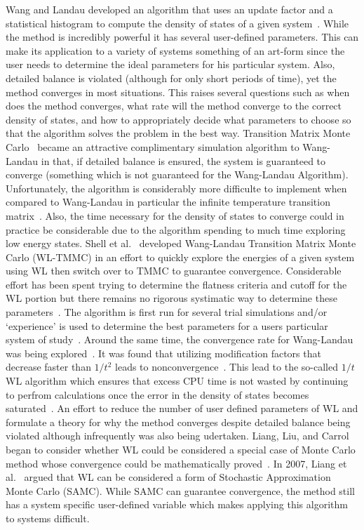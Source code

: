 \documentclass[letterpaper,twocolumn,amsmath,amssymb,pre,aps,10pt]{revtex4-1}
\begin{document}
Wang and Landau developed an algorithm that uses an update
factor and a statistical histogram to compute the density of states of
a given system~\cite{wang2001determining, wang2001efficient}.  While
the method is incredibly powerful it has several user-defined
parameters.  This can make its application to a variety of systems
something of an art-form since the user needs to determine the ideal
parameters for his particular system.  Also, detailed balance is
violated (although for only short periods of time), yet the method
converges in most situations.  This raises several questions such as
when does the method converges, what rate will the method converge to
the correct density of states, and how to appropriately decide what
parameters to choose so that the algorithm solves the problem in the
best way. Transition Matrix Monte Carlo~\cite{wang1999transition,
swendsen1999transition, fitzgerald2000monte} became an attractive
complimentary simulation algorithm to Wang-Landau in that, if detailed
balance is ensured, the system is guaranteed to converge (something
which is not guaranteed for the Wang-Landau Algorithm).  Unfortunately,
the algorithm is considerably more difficulte to implement when
compared to Wang-Landau in particular the infinite temperature
transition matrix~\cite{wang2002transition}.  Also, the time necessary
for the density of states to converge could in practice be considerable
due to the algorithm spending to much time exploring low energy states.
Shell et al.~\cite{shell2003improved, shell2004flat} developed
Wang-Landau Transition Matrix Monte Carlo (WL-TMMC) in an effort to
quickly explore the energies of a given system using WL then switch
over to TMMC to guarantee convergence. Considerable effort has been
spent trying to determine the flatness criteria and cutoff for the WL
portion but there remains no rigorous systimatic way to determine these
parameters~\cite{rane2013monte}.  The algorithm is first run for
several trial simulations and/or `experience' is used to determine the
best parameters for a users particular system of
study~\cite{siderius2013use}.  Around the same time, the convergence
rate for Wang-Landau was being explored~\cite{zhou2005understanding}.
It was found that utilizing modification factors that decrease faster
than $1/t^2$ leads to nonconvergence~\cite{belardinelli2007fast}.  This
lead to the so-called $1/t$ WL algorithm which ensures that excess CPU
time is not wasted by continuing to perfrom calculations once the error
in the density of states becomes
saturated~\cite{belardinelli2008analysis}. An effort to reduce the
number of user defined parameters of WL and formulate a theory for why
the method converges despite detailed balance being violated although
infrequently was also being udertaken.  Liang, Liu, and Carrol began to
consider whether WL could be considered a special case of Monte Carlo
method whose convergence could be mathematically
proved~\cite{liang2006theory, liang2007stochastic}. In 2007, Liang et
al.~\cite{liang2007stochastic} argued that WL can be considered a form
of Stochastic Approximation Monte Carlo (SAMC).  While SAMC can
guarantee convergence, the method still has a system specific
user-defined variable which makes applying this algorithm to systems
difficult.
\end{document}
